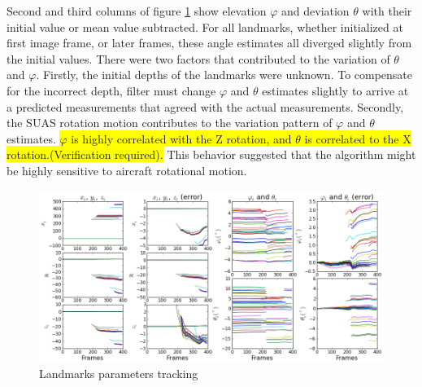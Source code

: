 Second and third columns of figure \ref{fltfig:2} show elevation
$\varphi$ and deviation $\theta$ with their initial value or mean
value subtracted. For all landmarks, whether initialized at first
image frame, or later frames, these angle estimates all diverged
slightly from the initial values. There were two factors that
contributed to the variation of $\theta$ and $\varphi$. Firstly, the
initial depths of the landmarks were unknown. To compensate for the
incorrect depth, filter must change $\varphi$ and $\theta$ estimates
slightly to arrive at a predicted measurements that agreed with the
actual measurements. Secondly, the SUAS rotation motion contributes to
the variation pattern of $\varphi$ and $\theta$ estimates.
\colorbox{yellow}{$\varphi$ is highly correlated with the Z rotation,
  and $\theta$ is correlated to the X rotation.(Verification
  required).} This behavior suggested that the algorithm might be
highly sensitive to aircraft rotational motion.

\begin{figure}[h]
\centering
\includegraphics[width=14cm, keepaspectratio=true]
{./Figures/fltfig/cut1/Figure20.png}
\caption{Landmarks parameters tracking}
\label{fltfig:2}
\end{figure}
\FloatBarrier

